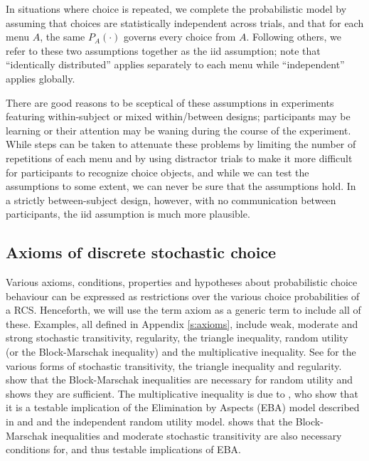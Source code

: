 \documentclass[11pt,letter]{article}
\newcommand{\menu}{menu}
\begin{document}
In situations where choice is repeated, we complete the probabilistic model by assuming that choices are statistically independent across trials, and that for each \menu{} $A$, the same $P_A(\cdot)$ governs every choice from $A$.
Following others, we refer to these two assumptions together as the iid assumption; note that ``identically distributed'' applies separately to each \menu{} while ``independent'' applies globally.

There are good reasons to be sceptical of these assumptions in experiments featuring within-subject or mixed within/between designs; participants may be learning or their attention may be waning during the course of the experiment.
While steps can be taken to attenuate these problems by limiting the number of repetitions of each \menu{} and by using distractor trials to make it more difficult for participants to recognize choice objects, and while we can test the assumptions to some extent, we can never be sure that the assumptions hold.
In a strictly between-subject design, however, with no communication between participants, the iid assumption is much more plausible.

\subsection{Axioms of discrete stochastic choice}

Various axioms, conditions, properties and hypotheses about probabilistic choice behaviour can be expressed as restrictions over the various choice probabilities of a RCS.
Henceforth, we will use the term axiom as a generic term to include all of these.
Examples, all defined in Appendix \ref{s:axioms}, include weak, moderate and strong stochastic transitivity, regularity, the triangle inequality, random utility (or the Block-Marschak inequality) and the multiplicative inequality.
See  for the various forms of stochastic transitivity, the triangle inequality and regularity.
 show that the Block-Marschak inequalities are necessary for random utility and 
 shows they are sufficient.
The multiplicative inequality is due to , who show that it is a testable implication of the Elimination by Aspects (EBA) model described in  and  and the independent random utility model.
 shows that the Block-Marschak inequalities and moderate stochastic transitivity are also necessary conditions for, and thus testable implications of EBA.
\end{document}
